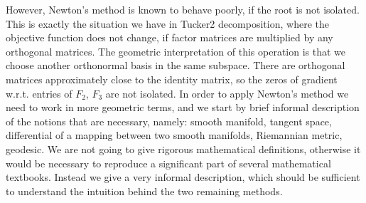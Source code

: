 However, Newton's method is known to behave poorly, if the root is not isolated.
This is exactly the situation we have in Tucker2 decomposition, where the objective function
does not change, if factor matrices are multiplied by any orthogonal matrices. The geometric
interpretation of this operation is that we choose another orthonormal basis in the same subspace.
There are orthogonal matrices approximately close to the identity matrix, so the zeros
of gradient w.r.t. entries of $F_2$, $F_3$ are not isolated. In order to apply Newton's method
we need to work in more geometric terms, and we start by brief informal description of the notions
that are necessary, namely: smooth manifold, tangent space, differential of a mapping between two smooth manifolds,
Riemannian metric, geodesic.
We are not going to give 
rigorous mathematical definitions, otherwise it would be necessary
to reproduce a significant part of several mathematical textbooks.
Instead we give a very informal description, which should be sufficient
to understand the intuition behind the two remaining methods.


